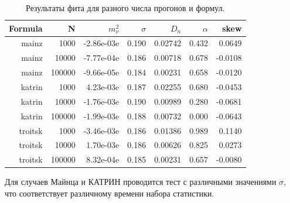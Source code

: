 ﻿\documentclass[a4paper,14pt]{extarticle}
\begin{document}
    \begin{table}
      \caption{Результаты фита для разного числа прогонов и формул.}
	    \begin{center}
		    \begin{tabular}{|r|r|r|r|r|r|r|}
			    \hline
			    Formula & N & $m^2_\nu$ & $\sigma$ & $D_n$ & $\alpha$ & skew \\
			    \hline
			    mainz & 1000 & -2.86e-03e & 0.190 & 0.02742 & 0.432 & 0.0649 \\
			    \hline
			    mainz & 10000 & -7.77e-04e & 0.186 & 0.00718 & 0.678 & -0.0108 \\
			    \hline
			    mainz & 100000 & -9.66e-05e & 0.184 & 0.00231 & 0.658 & -0.0120 \\
			    \hline
			    katrin & 1000 & 4.23e-03e & 0.187 & 0.02255 & 0.680 & -0.0453 \\
			    \hline
			    katrin & 10000 & -1.76e-03e & 0.190 & 0.00989 & 0.280 & -0.0681 \\
			    \hline
			    katrin & 100000 & -1.99e-03e & 0.188 & 0.00732 & 0.000 & -0.0643 \\
			    \hline
			    troitsk & 1000 & -3.46e-03e & 0.186 & 0.01386 & 0.989 & 0.1140 \\
			    \hline
			    troitsk & 10000 & 1.70e-03e & 0.186 & 0.00626 & 0.825 & 0.0273 \\
			    \hline
			    troitsk & 100000 & 8.32e-04e & 0.185 & 0.00231 & 0.657 & -0.0080 \\
			    \hline
		    \end{tabular}
	    \end{center}
    \end{table}
    
    Для случаев Майнца и КАТРИН проводится тест с различными значениями $\sigma$, что соответствует
    различному времени набора статистики.
      
\end{document}
